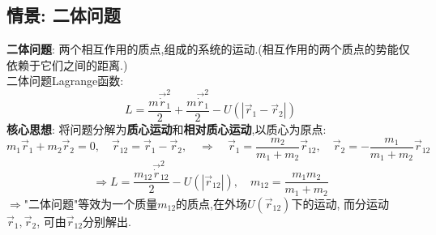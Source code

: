 \documentclass{article}
\begin{document}
\subsection{情景: 二体问题}
\textbf{二体问题}: 两个相互作用的质点,组成的系统的运动.(相互作用的两个质点的势能仅依赖于它们之间的距离.)\\
二体问题Lagrange函数:
$$L = \frac{m \vec \dot r_1^2}{2} + \frac{m \vec \dot r_1^2}{2} - U(|\vec r_1 - \vec r_2|)$$
\textbf{核心思想}: 将问题分解为\textbf{质心运动}和\textbf{相对质心运动},以质心为原点:
$$m_1\vec r_1 + m_2 \vec r_2 =0,\quad \vec r_{12} = \vec r_1 - \vec r_2, \quad \Rightarrow \quad \vec r_1 = \frac{m_2}{m_1 + m_2}\vec r_{12}, \quad \vec r_2 = - \frac{m_1}{m_1 + m_2}\vec r_{12} $$
$$\Rightarrow L = \frac{m_{12} \vec \dot r_{12}^2}{2} - U(|\vec r_{12}|), \quad m_{12} = \frac{m_1 m_2}{m_1 + m_2}$$
$\Rightarrow$"二体问题"等效为一个质量$m_{12}$的质点,在外场$U(\vec r_{12})$下的运动, 而分运动$\vec r_1, \vec r_2$, 可由$\vec r_{12}$分别解出.
\end{document}
